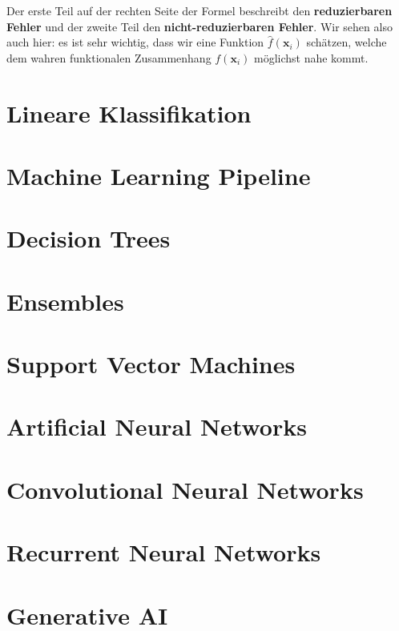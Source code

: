 \documentclass[
]{book}
\begin{document}
Der erste Teil auf der rechten Seite der Formel beschreibt den \textbf{reduzierbaren Fehler} und der zweite Teil den \textbf{nicht-reduzierbaren Fehler}. Wir sehen also auch hier: es ist sehr wichtig, dass wir eine Funktion \(\hat{f}(\mathbf{x}_i)\) schätzen, welche dem wahren funktionalen Zusammenhang \(f(\mathbf{x}_i)\) möglichst nahe kommt.

\hypertarget{lin-class}{%
\chapter{Lineare Klassifikation}\label{lin-class}}

\hypertarget{ml-pipeline}{%
\chapter{Machine Learning Pipeline}\label{ml-pipeline}}

\hypertarget{trees}{%
\chapter{Decision Trees}\label{trees}}

\hypertarget{ensembles}{%
\chapter{Ensembles}\label{ensembles}}

\hypertarget{svm}{%
\chapter{Support Vector Machines}\label{svm}}

\hypertarget{ann}{%
\chapter{Artificial Neural Networks}\label{ann}}

\hypertarget{cnn}{%
\chapter{Convolutional Neural Networks}\label{cnn}}

\hypertarget{rnn}{%
\chapter{Recurrent Neural Networks}\label{rnn}}

\hypertarget{gen-AI}{%
\chapter{Generative AI}\label{gen-AI}}

  
\end{document}
